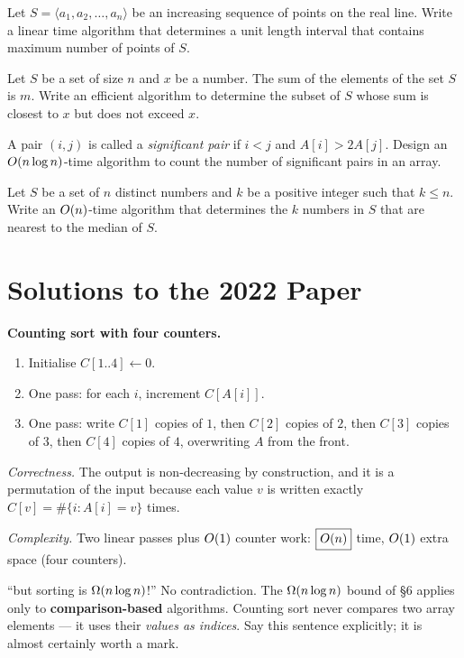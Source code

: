 Let $S=\langle a_1,a_2,\dots,a_n\rangle$ be an increasing sequence of points on the real line.
Write a linear time algorithm that determines a unit length interval that contains maximum
number of points of $S$.

Let $S$ be a set of size $n$ and $x$ be a number. The sum of the elements of the set $S$ is $m$.
Write an efficient algorithm to determine the subset of $S$ whose sum is closest to $x$ but does
not exceed $x$.

A pair $(i,j)$ is called a \emph{significant pair} if $i<j$ and $A[i]>2A[j]$. Design an
$O(n\log n)$-time algorithm to count the number of significant pairs in an array.

Let $S$ be a set of $n$ distinct numbers and $k$ be a positive integer such that $k\le n$. Write
an $O(n)$-time algorithm that determines the $k$ numbers in $S$ that are nearest to the median
of $S$.

\section{Solutions to the 2022 Paper}

\setcounter{pq}{0}

 \textbf{Counting sort with four counters.}
\begin{enumerate}
  \item Initialise $C[1..4]\leftarrow0$.
  \item One pass: for each $i$, increment $C[A[i]]$.
  \item One pass: write $C[1]$ copies of $1$, then $C[2]$ copies of $2$, then $C[3]$ copies of
        $3$, then $C[4]$ copies of $4$, overwriting $A$ from the front.
\end{enumerate}
\emph{Correctness.} The output is non-decreasing by construction, and it is a permutation of the
input because each value $v$ is written exactly $C[v]=\#\{i:A[i]=v\}$ times.

\emph{Complexity.} Two linear passes plus $O(1)$ counter work: $\boxed{O(n)}$ time, $O(1)$ extra
space (four counters).

\begin{trap}{``but sorting is $\Omega(n\log n)$!''}
No contradiction. The $\Omega(n\log n)$ bound of \S6 applies only to \textbf{comparison-based}
algorithms. Counting sort never compares two array elements --- it uses their \emph{values as
indices}. Say this sentence explicitly; it is almost certainly worth a mark.
\end{trap}

